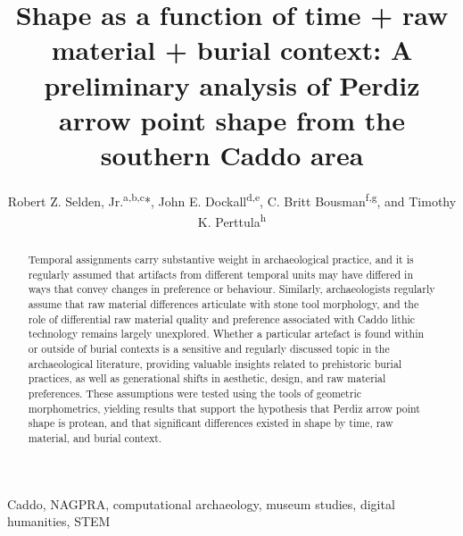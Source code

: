 \documentclass[review]{elsarticle}
\begin{document}
\begin{frontmatter}

\title{Shape as a function of time + raw material + burial context: A preliminary analysis of Perdiz arrow point shape from the southern Caddo area}

\author{Robert Z. Selden, Jr.\textsuperscript{a,b,c}*, John E. Dockall\textsuperscript{d,e}, C. Britt Bousman\textsuperscript{f,g}, and Timothy K. Perttula\textsuperscript{h}}
\address[1]{Heritage Research Center, Stephen F. Austin State University, US}
\address[2]{Cultural Heritage Department, Jean Monnet University, FR}
\address[3]{ORCID ID \href{http://orcid.org/0000-0002-1789-8449}{0000-0002-1789-8449}}
\address[4]{Cox|McClain Environmental Consulting, Inc., US}
\address[5]{ORCID ID \href{http://orcid.org/0000-0002-0940-7144}{0000-0002-0940-7144}}
\address[6]{Department of Anthropology, Texas State University, US}
\address[7]{ORCID ID \href{http://orcid.org/0000-0002-1645-8302}{0000-0002-1645-8302}}
\address[8]{Archeological \& Environmental Consultants, LLC, US}

\begin{abstract}
Temporal assignments carry substantive weight in archaeological practice, and it is regularly assumed that artifacts from different temporal units may have differed in ways that convey changes in preference or behaviour. Similarly, archaeologists regularly assume that raw material differences articulate with stone tool morphology, and the role of differential raw material quality and preference associated with Caddo lithic technology remains largely unexplored. Whether a particular artefact is found within or outside of burial contexts is a sensitive and regularly discussed topic in the archaeological literature, providing valuable insights related to prehistoric burial practices, as well as generational shifts in aesthetic, design, and raw material preferences. These assumptions were tested using the tools of geometric morphometrics, yielding results that support the hypothesis that Perdiz arrow point shape is protean, and that significant differences existed in shape by time, raw material, and burial context.
\end{abstract}

\begin{keyword}
Caddo, NAGPRA, computational archaeology, museum studies, digital humanities, STEM
\end{keyword}

\end{frontmatter}
\end{document}
